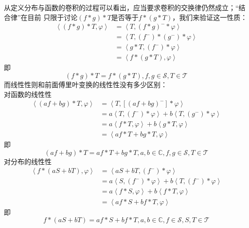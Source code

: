 \documentclass{ctexbook}
\begin{document}
从定义分布与函数的卷积的过程可以看出，应当要求卷积的交换律仍然成立；“结合律”在目前
只限于讨论$(f*g)*T$是否等于$f*(g*T)$，我们来验证这一性质：
\begin{align*}
    \left\langle (f*g)*T,\varphi\right\rangle & =\left\langle T,(f*g)^- *\varphi\right\rangle\\
    & =\left\langle T,(f^-)*(g^-)*\varphi\right\rangle\\
    & =\left\langle g*T,(f^-)*\varphi\right\rangle\\
    & =\left\langle f*(g*T),\varphi\right\rangle
\end{align*}
即\[(f*g)*T=f*(g*T),f,g\in\mathcal{S} ,T\in\mathcal{T}\]
而线性性则和前面傅里叶变换的线性性没有多少区别：\\
对函数的线性性
\begin{align*}
    \left\langle (af+bg)*T,\varphi\right\rangle & =\left\langle T,[(af+bg)^-]*\varphi\right\rangle                                               \\
                                     & =a\left\langle T,(f^-)*\varphi\right\rangle+b\left\langle T,(g^-)*\varphi\right\rangle                    \\
                                     & =a\left\langle f*T,\varphi\right\rangle+b\left\langle g*T,\varphi\right\rangle                            \\
                                     & =\left\langle af*T+bg*T,\varphi\right\rangle
\end{align*}
即\[(af+bg)*T=af*T+bg*T,a,b\in\mathbb{C},f,g\in\mathcal{S} ,T\in\mathcal{T} \]
{\parskip=0pt  对分布的线性性}
\begin{align*}
    \left\langle f*(aS+bT),\varphi\right\rangle & =\left\langle aS+bT,(f^-)*\varphi\right\rangle                                                 \\
                                     & =a\left\langle S,(f^-)*\varphi\right\rangle+b\left\langle T,(f^-)*\varphi\right\rangle                    \\
                                     & =a\left\langle f*S,\varphi\right\rangle+b\left\langle f*T,\varphi\right\rangle                            \\
                                     & =\left\langle af*S+bf*T,\varphi\right\rangle
\end{align*}
即\[f*(aS+bT)=af*S+bf*T,a,b\in\mathbb{C},f\in\mathcal{S} ,S,T\in\mathcal{T}\]
\end{document}
